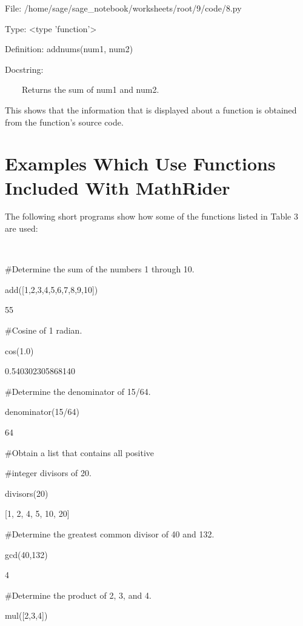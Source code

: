 \documentclass[12pt,oneside]{book}
\begin{document}
{\textbar}

File: /home/sage/sage\_notebook/worksheets/root/9/code/8.py   

Type: {\textless}type 'function'{\textgreater}

Definition: addnums(num1, num2)        

Docstring:            

              

\ \ \ \ Returns the sum of num1 and num2.       


This shows that the information that is displayed about a function is obtained from the function's source code.

\section[Examples Which Use Functions Included With MathRider]{ Examples Which Use Functions Included With MathRider}

The following short programs show how some of the functions listed in Table 3 are used:

\ 

\#Determine the sum of the numbers 1 through 10.

add([1,2,3,4,5,6,7,8,9,10])

{\textbar}

55


\#Cosine of 1 radian.

cos(1.0)

{\textbar}

0.540302305868140

\#Determine the denominator of 15/64.

denominator(15/64)

{\textbar}

64


\#Obtain a list that contains all positive 

\#integer divisors of 20.

divisors(20)

{\textbar}

[1, 2, 4, 5, 10, 20]


\#Determine the greatest common divisor of 40 and 132.

gcd(40,132)

{\textbar}

4


\#Determine the product of 2, 3, and 4.

mul([2,3,4])

{\textbar}
\end{document}
